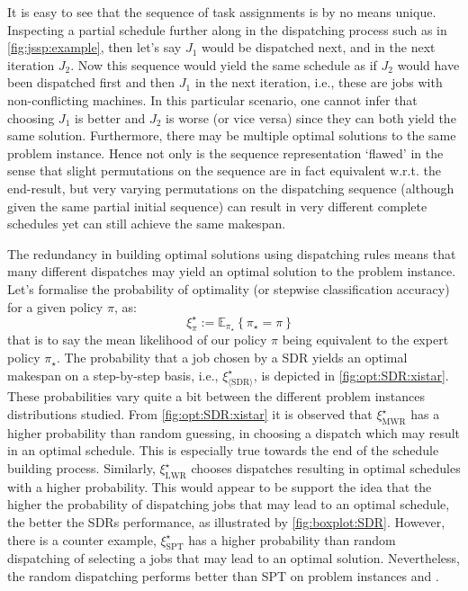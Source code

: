 \documentclass[twocolumn]{svjour3}
\begin{document}
It is easy to see that the sequence of task assignments is by no means unique. 
Inspecting a partial schedule further along in the dispatching process such as 
in \cref{fig:jssp:example}, then let's say $J_1$ would be dispatched next, and 
in the next iteration $J_2$. Now this sequence would yield the same schedule as 
if $J_2$ would have been dispatched first and then $J_1$ in the next iteration, 
i.e., these are jobs with non-conflicting machines.  
In this particular scenario, one cannot infer that choosing $J_1$ is better 
and $J_2$ is worse (or vice versa) since they can both yield the same solution.
Furthermore, 
there may be multiple optimal solutions to the same 
problem instance. Hence not only is the sequence representation `flawed' in the 
sense that slight permutations on the sequence are in fact equivalent w.r.t. 
the end-result, but very varying permutations on the dispatching sequence 
(although given the same partial initial sequence) can result in very different 
complete schedules yet can still achieve the same makespan. 

The redundancy in building optimal solutions using dispatching rules means that 
many different dispatches may yield an optimal solution to the problem instance.
Let's formalise the probability of optimality (or stepwise 
classification accuracy) for a given policy $\pi$, as:
\begin{equation}\quad \label{eq:tracc:opt}
\xi^\star_{\pi} := \mathbb{E}_{\pi_\star}\left\{\pi_{\star} = \pi \right\}
\end{equation}
that is to say the mean likelihood of our policy $\pi$ being equivalent to the 
expert policy $\pi_\star$.
The probability that a job chosen by a SDR yields an optimal makespan on a 
step-by-step basis, i.e., $\xi^\star_{\langle \text{SDR} \rangle}$, is depicted 
in \cref{fig:opt:SDR:xistar}. These probabilities
vary quite a bit between the different problem instances distributions studied. 
From \cref{fig:opt:SDR:xistar} it is observed that $\xi^\star_{\text{MWR}}$ has 
a higher probability than random guessing, in choosing a dispatch which may 
result in an optimal schedule. This is especially true towards the end of the 
schedule building process. 
Similarly, $\xi^\star_{\text{LWR}}$ chooses dispatches 
resulting in optimal schedules with a higher probability. This would appear to 
be support the idea that the higher the probability of dispatching jobs that 
may lead to an optimal schedule, the better the SDRs performance, as 
illustrated by \cref{fig:boxplot:SDR}. However, there is a counter example, 
$\xi^\star_{\text{SPT}}$ has a higher probability than random dispatching of 
selecting a jobs that may lead to an optimal solution. Nevertheless, the random 
dispatching performs better than SPT on problem instances  and 
. 
\end{document}
